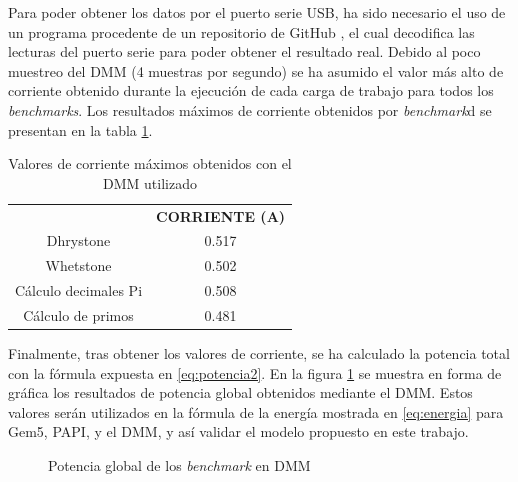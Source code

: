 Para poder obtener los datos por el puerto serie \ac{USB}, ha sido necesario el uso de un programa procedente de un repositorio de GitHub \cite{dmm-github-repo}, el cual decodifica las lecturas del puerto serie para poder obtener el resultado real. Debido al poco muestreo del \ac{DMM} (4 muestras por segundo) se ha asumido el valor más alto de corriente obtenido durante la ejecución de cada carga de trabajo para todos los \textit{benchmarks}. Los resultados máximos de corriente obtenidos por \textit{benchmark}d se presentan en la tabla \ref{fig:valoresCorrienteDMM}. 

\begin{table}[h]
\centering
    \begin{tabular}{|c|c|}
      \hline
      \rowcolor[HTML]{C0C0C0}
      \multicolumn{2}{|c|}{\cellcolor[HTML]{C0C0C0} \textbf{VALORES DMM}} \\ \hline
      \rowcolor[HTML]{EFEFEF}
      \multicolumn{1}{|c|}{\cellcolor[HTML]{EFEFEF} \textbf{BENCHMARK}} &  \textbf{CORRIENTE (A)} \\ \hline
      \multicolumn{1}{|c|}{ Dhrystone} &  0.517 \\ \hline
      \multicolumn{1}{|c|}{ Whetstone} &  0.502 \\ \hline
      \multicolumn{1}{|c|}{ Cálculo decimales Pi} &  0.508 \\ \hline
      \multicolumn{1}{|c|}{ Cálculo de primos} &  0.481 \\ \hline
    \end{tabular}
\caption{Valores de corriente máximos obtenidos con el DMM utilizado}
\label{fig:valoresCorrienteDMM}
\end{table}

Finalmente, tras obtener los valores de corriente, se ha calculado la potencia total con la fórmula expuesta en \ref{eq:potencia2}. En la figura \ref{fig:potenciaDMM} se muestra en forma de gráfica los resultados de potencia global obtenidos mediante el DMM.  Estos valores serán utilizados en la fórmula de la energía mostrada en \ref{eq:energia} para Gem5, PAPI, y el DMM, y así validar el modelo propuesto en este trabajo.

\begin{figure}[H]
    \centering
    \caption{Potencia global de los \textit{benchmark} en DMM}
    \label{fig:potenciaDMM}
\end{figure}

